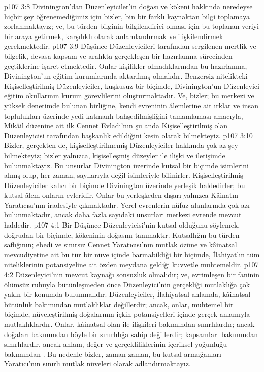 \vs p107 3:8 Divinington’dan Düzenleyiciler’in doğası ve kökeni hakkında neredeyse hiçbir şey öğrenemediğimiz için bizler, bin bir farklı kaynaktan bilgi toplamaya zorlanmaktayız; ve, bu türden bilginin bilgilendirici olması için bu toplanan veriyi bir araya getirmek, karşılıklı olarak anlamlandırmak ve ilişkilendirmek gerekmektedir.
\vs p107 3:9 Düşünce Düzenleyicileri tarafından sergilenen mertlik ve bilgelik, devasa kapsam ve aralıkta gerçekleşen bir hazırlanma sürecinden geçtiklerine işaret etmektedir. Onlar kişilikler olmadıklarından bu hazırlanma, Divinington’un eğitim kurumlarında aktarılmış olmalıdır. Benzersiz nitelikteki Kişiselleştirilmiş Düzenleyiciler, kuşkusuz bir biçimde, Divinington’un Düzenleyici eğitim okullarının kurum görevlilerini oluşturmaktadır. Ve, bizler; bu merkezi ve yüksek denetimde bulunan birliğine, kendi evreninin âlemlerine ait ırklar ve insan toplulukları üzerinde yedi katmanlı bahşedilmişliğini tamamlaması amacıyla, Mikâil düzenine ait ilk Cennet Evladı’nın şu anda Kişiselleştirilmiş olan Düzenleyicisi tarafından başkanlık edildiğini kesin olarak bilmekteyiz.
\vs p107 3:10 Bizler, gerçekten de, kişiselleştirilmemiş Düzenleyiciler hakkında çok az şey bilmekteyiz; bizler yalnızca, kişiselleşmiş düzeyler ile ilişki ve iletişimde bulunmaktayız. Bu unsurlar Divinington üzerinde kutsal bir biçimde isimlerini almış olup, her zaman, sayılarıyla değil isimleriyle bilinirler. Kişiselleştirilmiş Düzenleyiciler kalıcı bir biçimde Divinington üzerinde yerleşik haldedirler; bu kutsal âlem onların evleridir. Onlar bu yerleşkeden dışarı yalnızca Kâinatın Yaratıcısı’nın iradesiyle çıkmaktadır. Yerel evrenlerin nüfuz alanlarında çok azı bulunmaktadır, ancak daha fazla sayıdaki unsurları merkezi evrende mevcut haldedir.
\vs p107 4:1 Bir Düşünce Düzenleyicisi’nin kutsal olduğunu söylemek, doğrudan bir biçimde, kökeninin doğasını tanımaktır. Kutsallığın bu türden saflığının; ebedi ve sınırsız Cennet Yaratıcısı’nın mutlak özüne ve kâinatsal mevcudiyetine ait bu tür bir nüve içinde barınabildiği bir biçimde, İlahiyat’ın tüm niteliklerinin potansiyeline ait özden meydana geldiği kuvvetle muhtemeldir.
\vs p107 4:2 Düzenleyici’nin mevcut kaynağı sonsuzluk olmalıdır; ve, evrimleşen bir faninin ölümsüz ruhuyla bütünleşmeden önce Düzenleyici’nin gerçekliği mutlaklığa çok yakın bir konumda bulunmalıdır. Düzenleyiciler, İlahiyatsal anlamda, kâinatsal bütünlük bakımından mutlaklıklar değillerdir; ancak, onlar, muhtemel bir biçimde, nüveleştirilmiş doğalarının içkin potansiyelleri içinde gerçek anlamıyla mutlaklıklardır. Onlar, kâinatsal olan ile ilişkileri bakımından sınırlılardır; ancak doğaları bakımından böyle bir sınırlılığa sahip değillerdir; kapsamları bakımından sınırlılardır, ancak anlam, değer ve gerçekliliklerinin içeriksel yoğunluğu bakımından . Bu nedenle bizler, zaman zaman, bu kutsal armağanları Yaratıcı’nın sınırlı mutlak nüveleri olarak adlandırmaktayız.

